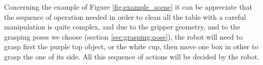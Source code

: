 Concerning the example of Figure \ref{fig:example_scene} it can be appreciate that the sequence of operation needed in order to clean all the table with a careful manipulation is quite complex, and due to the gripper geometry, and to the grasping poses we choose (section \ref{sec:grasping:pose}), the robot will need to grasp first the purple top object, or the white cup, then move one box in other to grasp the one of its side. All this sequence of actions will be decided by the robot.



